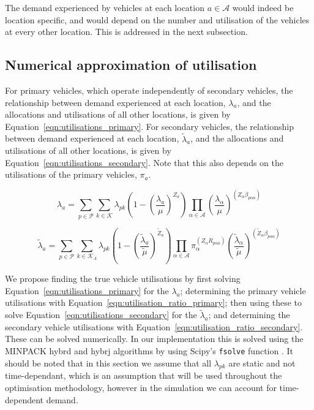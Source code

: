 \documentclass[numbers,webpdf,imaman]{ima-authoring-template}%
\begin{document}
The demand experienced by vehicles at each location $a \in \mathcal{A}$ would
indeed be location specific, and would depend on the number and utilisation of
the vehicles at every other location. This is addressed in the next subsection.


\subsection{Numerical approximation of utilisation}
For primary vehicles, which operate independently of secondary vehicles, the
relationship between demand experienced at each location, $\lambda_a$, and the
allocations and utilisations of all other locations, is given by
Equation~\ref{eqn:utilisations_primary}. For secondary vehicles, the
relationship between demand experienced at each location, $\tilde{\lambda}_a$,
and the allocations and utilisations of all other locations, is given by
Equation~\ref{eqn:utilisations_secondary}. Note that this also depends on the
utilisations of the primary vehicles, $\pi_a$.

\begin{equation}\label{eqn:utilisations_primary}
\lambda_a = \sum_{p \in \mathcal{P}} \sum_{k \in \mathcal{K}} \lambda_{pk}
\left( 1 - \left(\frac{\lambda_a}{\mu}\right)^{Z_a} \right)
\prod_{\alpha \in \mathcal{A}} \left(\frac{\lambda_{\alpha}}{\mu}\right)^{
\left(Z_{\alpha} \beta_{p \alpha a}\right)}
\end{equation}

\begin{equation}\label{eqn:utilisations_secondary}
\tilde{\lambda}_a = \sum_{p \in \mathcal{P}}
\sum_{k \in \mathcal{K}_A} \lambda_{pk}
\left( 1 - \left(\frac{\tilde{\lambda}_a}{\tilde{\mu}}\right)^{\tilde{Z}_a} \right)
\prod_{\alpha \in \mathcal{A}} \pi_{\alpha}^{\left(Z_{\alpha} R_{p \alpha a}\right)}
\left(\frac{\tilde{\lambda}_{\alpha}}{\tilde{\mu}}\right)^{
\left(\tilde{Z}_{\alpha} \beta_{p \alpha a}\right)}
\end{equation}

We propose finding the true vehicle utilisations by first solving
Equation~\ref{eqn:utilisations_primary} for the $\lambda_a$; determining the
primary vehicle utilisations with Equation~\ref{eqn:utilisation_ratio_primary};
then using these to solve Equation~\ref{eqn:utilisations_secondary} for the
$\tilde{\lambda}_a$; and determining the secondary vehicle utilisations with
Equation~\ref{eqn:utilisation_ratio_secondary}. These can be solved
numerically. In our implementation this is solved using the MINPACK hybrd and
hybrj algorithms by using Scipy's \texttt{fsolve} function
\citep{2020SciPy-NMeth}. It should be noted that in this section we assume that
all $\lambda_{pk}$ are static and not time-dependant, which is an assumption
that will be used throughout the optimisation methodology, however in the
simulation we can account for time-dependent demand.
\end{document}
